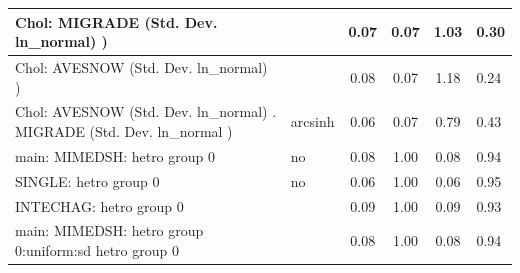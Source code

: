 \begin{table}
\begin{center}
\begin{tabular}{|l|l|c|c|c|l|}
			\hline
			 Chol: MIGRADE (Std. Dev. ln_normal) ) &  & 0.07 & 0.07 & 1.03 & 0.30 \\
			\hline
			 Chol: AVESNOW (Std. Dev. ln_normal) ) &  & 0.08 & 0.07 & 1.18 & 0.24 \\
			\hline
			 Chol: AVESNOW (Std. Dev. ln_normal) . MIGRADE (Std. Dev.   ln_normal ) & arcsinh & 0.06 & 0.07 & 0.79 & 0.43 \\
			\hline
			main: MIMEDSH: hetro group 0 & no & 0.08 & 1.00 & 0.08 & 0.94 \\
			\hline
			SINGLE: hetro group 0 & no & 0.06 & 1.00 & 0.06 & 0.95 \\
			\hline
			INTECHAG: hetro group 0 &  & 0.09 & 1.00 & 0.09 & 0.93 \\
			\hline
			main: MIMEDSH: hetro group 0:uniform:sd  hetro group 0 &  & 0.08 & 1.00 & 0.08 & 0.94 \\
			\hline
		\end{tabular}
	\end{center}
\end{table}